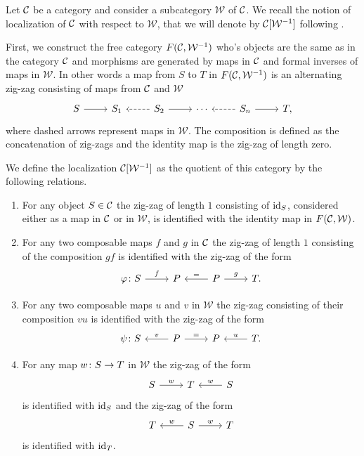 \documentclass[letterpaper,12pt,leqno]{article}
\numberwithin{equation}{theorem}
\def\cW{\mathcal{W}}
\begin{document}
\begin{nparagraph}
Let $\mathcal{C}$ be a category and consider a subcategory $\cW$ of $\mathcal{C}$. We recall the notion of localization of $\mathcal{C}$ with respect to $\cW$, that we will denote by $\C[\cW^{-1}]$
following \cite{Hovey}.

First, we construct the free category $F(\C, \cW^{-1})$ who's objects are the same as in the category $\mathcal{C}$ and morphisms are generated by maps in $\mathcal{C}$ and formal inverses of
maps in $\cW$. In other words a map from $S$ to $T$ in $F(\C, \cW^{-1})$ is an alternating zig-zag consisting of maps from $\mathcal{C}$ and $\cW$
$$
\begin{tikzcd}
S \ar[r] & S_1 & S_2 \ar[dashed, l] \ar[r] & \cdots & S_n \ar[dashed, l] \ar[r] & T,
\end{tikzcd}
$$
where dashed arrows represent maps in $\cW$. The composition is defined as the concatenation of zig-zags and the identity map is the zig-zag of length zero.

We define the localization $\C[\cW^{-1}]$ as the quotient of this category by the following relations.
\begin{enumerate}[label=\alph*)]
\item For any object $S \in \mathcal{C}$ the zig-zag of length $1$ consisting of $\mathrm{id}_S$, considered either as a map in $\mathcal{C}$ or in $\cW$, is identified with the identity map in $F(\C, \cW)$.
\item For any two composable maps $f$ and $g$ in $\mathcal{C}$ the zig-zag of length $1$ consisting of the composition $gf$ is identified with the zig-zag of the form
$$
\begin{tikzcd}
\phi\from S \ar[r, "f"] & P & P \ar[l, "="'] \ar[r, "g"] & T.
\end{tikzcd}
$$
\item For any two composable maps $u$ and $v$ in $\cW$ the zig-zag consisting of their composition $vu$ is identified with the zig-zag of the form
$$
\begin{tikzcd}
\psi\from S & P \ar[l, "v"'] \ar[r, "="] & P & T \ar[l, "u"'].
\end{tikzcd}
$$
\item For any map $w\colon S \to T$ in $\cW$ the zig-zag of the form
$$
\begin{tikzcd}
S \ar[r, "w"] & T & S \ar[l, "w"']
\end{tikzcd}
$$
is identified with $\mathrm{id}_S$ and the zig-zag of the form
$$
\begin{tikzcd}
T & S \ar[l, "w"'] \ar[r, "w"] & T 
\end{tikzcd}
$$
is identified with $\mathrm{id}_T$.
\end{enumerate}


\end{nparagraph}
\end{document}
